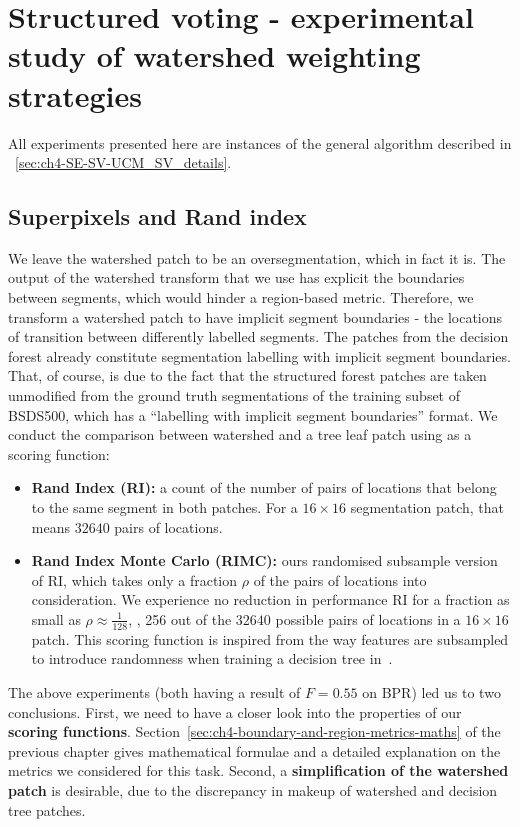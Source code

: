 \section[Structured voting]{Structured voting - experimental study of watershed weighting strategies}
\label{sec:ch5-structured-voting}
All experiments presented here are instances of the general algorithm described in \textsection~\ref{sec:ch4-SE-SV-UCM_SV_details}.

\subsection*{Superpixels and Rand index}
We leave the watershed patch to be an oversegmentation, which in fact it is. The output of the watershed transform that we use has explicit the boundaries between segments, which would hinder a region-based metric. Therefore, we transform a watershed patch to have implicit segment boundaries - the locations of transition between differently labelled segments. 
The patches from the decision forest already constitute segmentation labelling with implicit segment boundaries. That, of course, is due to the fact that the structured forest patches are taken unmodified from the ground truth segmentations of the training subset of BSDS500, which has a ``labelling with implicit segment boundaries'' format. We conduct the comparison between watershed and a tree leaf patch using as a scoring function:

\begin{itemize}
 \item{\bf Rand Index (RI):} a count of the number of pairs of locations that belong to the same segment in both patches. For a $16\times16$ segmentation patch, that means $32 640$ pairs of locations.
 \item{\bf Rand Index Monte Carlo (RIMC):} ours randomised subsample version of RI, which takes only a fraction $\rho$ of the pairs of locations into consideration. We experience no reduction in performance \wrt RI for a fraction as small as $\rho\approx\frac{1}{128}$, \ie, 256 out of the $32 640$ possible pairs of locations in a $16 \times 16$ patch. This scoring function is inspired from the way features are subsampled to introduce randomness when training a decision tree in~\cite{DollarICCV13edges,Dollar2013toolbox}.
\end{itemize}

The above experiments (both having a result of $F=0.55$ on BPR) led us to two conclusions. First, we need to have a closer look into the properties of our \textbf{scoring functions}. Section~\ref{sec:ch4-boundary-and-region-metrics-maths} of the previous chapter gives mathematical formulae and a detailed explanation on the metrics we considered for this task. Second, a \textbf{simplification of the watershed patch} is desirable, due to the discrepancy %
in makeup %
of watershed and decision tree patches.

